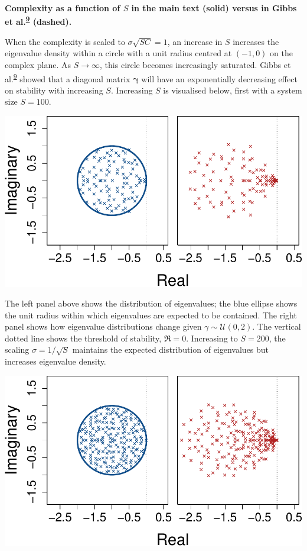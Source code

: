 \documentclass[]{article}
\begin{document}
\textbf{Complexity as a function of \(S\) in the main text (solid)
versus in Gibbs et
al.\textsuperscript{\protect\hyperlink{ref-Gibbs2017}{9}} (dashed).}

When the complexity is scaled to \(\sigma\sqrt{SC} = 1\), an increase in
\(S\) increases the eigenvalue density within a circle with a unit
radius centred at \((-1, 0)\) on the complex plane. As \(S \to \infty\),
this circle becomes increasingly saturated. Gibbs et
al.\textsuperscript{\protect\hyperlink{ref-Gibbs2017}{9}} showed that a
diagonal matrix \(\mathbf{\gamma}\) will have an exponentially
decreasing effect on stability with increasing \(S\). Increasing \(S\)
is visualised below, first with a system size \(S = 100\).

\includegraphics{SI_files/figure-latex/unnamed-chunk-36-1.pdf}

The left panel above shows the distribution of eigenvalues; the blue
ellipse shows the unit radius within which eigenvalues are expected to
be contained. The right panel shows how eigenvalue distributions change
given \(\gamma \sim \mathcal{U}(0,2)\). The vertical dotted line shows
the threshold of stability, \(\Re = 0\). Increasing to \(S = 200\), the
scaling \(\sigma = 1 / \sqrt{S}\) maintains the expected distribution of
eigenvalues but increases eigenvalue density.

\includegraphics{SI_files/figure-latex/unnamed-chunk-37-1.pdf}
\end{document}
